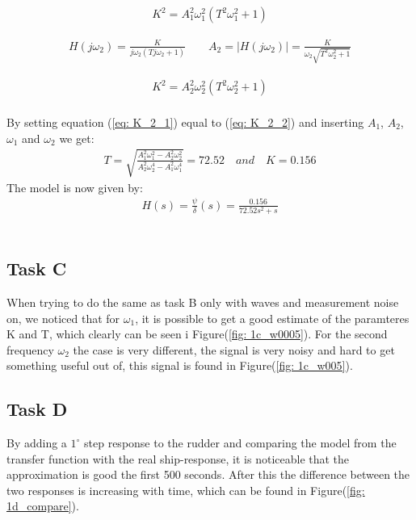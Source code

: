 \begin{equation}
    \begin{align}
        K^2 = A_1^2\omega_1^2(T^2\omega_1^2 + 1) \label{eq: K_2_1}
    \end{align}
\end{equation}

\begin{equations}
    \begin{align}
        H(j\omega_2) = \frac{K}{j\omega_2(Tj\omega_2 + 1)} \qquad A_2 = |H(j\omega_2)| = \frac{K}{\omega_2\sqrt{T^2\omega_2^2 + 1}} \nonumber
    \end{align}
\end{equations}
\begin{equation}
    \begin{align}
        K^2 = A_2^2\omega_2^2(T^2\omega_2^2 + 1) \label{eq: K_2_2}
    \end{align}
\end{equation}
\\
By setting equation (\ref{eq: K_2_1}) equal to (\ref{eq: K_2_2}) and inserting $A_1$, $A_2$, $\omega_1$ and $\omega_2$ we get:
\begin{equation}
    \begin{align}
        T = \sqrt{\frac{A_1^2\omega_1^2 - A_2^2\omega_2^2}{A_2^2\omega_2^4 - A_1^2\omega_1^4}} = 72.52 \quad and \quad K = 0.156  \label{eq: T}
        \end{align}
\end{equation}
\newpage
The model is now given by:
\begin{equation}
    \begin{align}
        H(s) = \frac{\psi}{\delta}(s) = \frac{0.156}{72.52s^2+s}
    \end{align}
\end{equation}
\\

\subsection{Task C}
When trying to do the same as task B only with waves and measurement noise on, we noticed that for $\omega_1$, it is possible to get a good estimate of the paramteres K and T, which clearly can be seen i Figure(\ref{fig: 1c_w0005}). For the second frequency $\omega_2$ the case is very different, the signal is very noisy and hard to get something useful out of, this signal is found in Figure(\ref{fig: 1c_w005}).
\\

\subsection{Task D}
By adding a $1^{\circ}$ step response to the rudder and comparing the model from the transfer function with the real ship-response, it is noticeable that the approximation is good the first 500 seconds. After this the difference between the two responses is increasing with time, which can be found in Figure(\ref{fig: 1d_compare}).
\newpage

